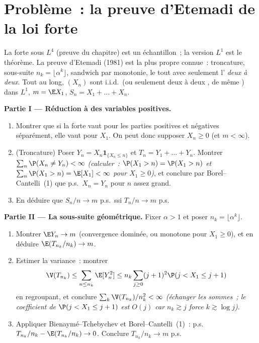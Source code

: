 \section{Problème~: la preuve d'Etemadi de la loi forte}

\begin{problem}\label{pb:b3:probability:1}
La  forte sous $L^4$ (preuve du chapitre) est un
échantillon~; la version $L^1$ est le théorème. La preuve
d'Etemadi (1981) est la plus propre connue~: troncature,
sous-suite $n_k = \lfloor\alpha^k\rfloor$, sandwich par
monotonie, le tout avec seulement l'\emph{ deux
à deux}. Tout au long, $(X_n)$ sont i.i.d.\ (ou seulement
deux à deux , de même ) dans $L^1$, $m =
\E X_1$, $S_n = X_1 + \dots + X_n$.

\medskip
\noindent\textbf{Partie I --- Réduction à des variables
positives.}
\begin{enumerate}
  \item Montrer que si la  forte vaut pour les parties
        positives et négatives séparément, elle vaut pour
        $X_1$. On peut donc supposer $X_n \geq 0$ (et $m <
        \infty$).
  \item (Troncature) Poser $Y_n = X_n\mathbf 1_{\{X_n \leq
        n\}}$ et $T_n = Y_1 + \dots + Y_n$. Montrer
        $\sum_n\P(X_n \neq Y_n) < \infty$
        \emph{(calculer~: $\P(X_1 > n) = \P(X_1 >
        n)$ et $\sum_n\P(X_1 > n) = \E[X_1] < \infty$ pour
        $X_1 \geq 0$)}, et conclure par Borel--Cantelli~(1)
        que p.s.\ $X_n = Y_n$ pour $n$ assez grand.
  \item En déduire que $S_n/n \to m$ p.s.\ ssi $T_n/n \to
        m$ p.s.
\end{enumerate}

\medskip
\noindent\textbf{Partie II --- La sous-suite géométrique.}
Fixer $\alpha > 1$ et poser $n_k = \lfloor\alpha^k\rfloor$.
\begin{enumerate}[resume]
  \item Montrer $\E Y_n \to m$ (convergence dominée, ou
        monotone pour $X_1 \geq 0$), et en déduire
        $\E(T_{n_k}/n_k) \to m$.
  \item Estimer la variance~: montrer
        \[
        \V(T_{n_k}) \leq \sum_{n\leq n_k}\E[Y_n^2] \leq
        n_k\sum_{j\geq0}(j+1)^2\P(j < X_1 \leq j+1)
        \]
        en regroupant, et conclure $\sum_k\V(T_{n_k})/n_k^2
        < \infty$ \emph{(échanger les sommes~; le
        coefficient de $\P(j < X_1 \leq j+1)$ est $O(j)$
        car $n_k \gtrsim j$ force $k \gtrsim \log j$)}.
  \item Appliquer Bienaymé--Tchebychev et
        Borel--Cantelli~(1)~: p.s.\ $T_{n_k}/n_k -
        \E(T_{n_k}/n_k) \to 0$. Conclure
        $T_{n_k}/n_k \to m$ p.s.
\end{enumerate}


\end{problem}
